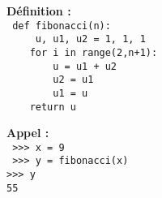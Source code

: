\noindent\mbox{}\hspace*{1cm}\begin{py}{6cm}
{\bf Définition :}\\
{\tt
def fibonacci(n):\\
{\color{blue}
\mbox{}\ \ \ \ u, u1, u2 = 1, 1, 1\\
\mbox{}\ \ \ \ for i in range(2,n+1):\\
\mbox{}\ \ \ \ \ \ \ \ u = u1 + u2\\
\mbox{}\ \ \ \ \ \ \ \ u2 = u1\\
\mbox{}\ \ \ \ \ \ \ \ u1 = u}\\
\mbox{}\ \ \ \ return u\\
\mbox{}}
\end{py}\hfill
\begin{py}{6cm}
{\bf Appel :}\\\tt
>>> x = 9\\
{\color{red}
>>> y = fibonacci(x)}\\
>>> y\\
55
\end{py}

